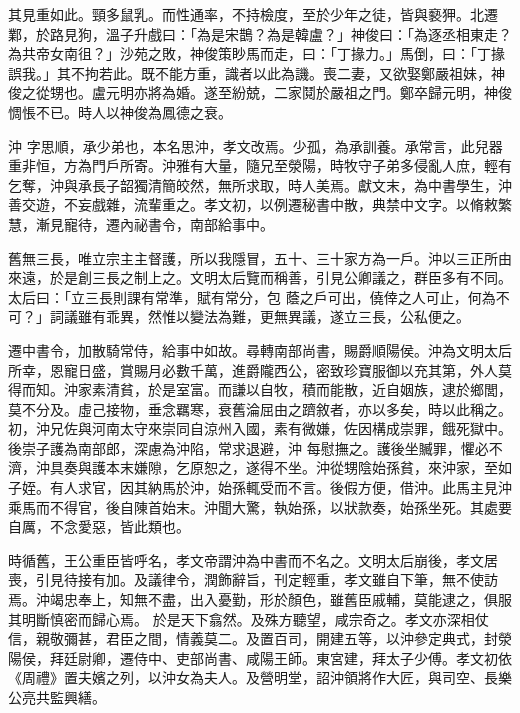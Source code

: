 \begin{pinyinscope}
 其見重如此。頸多鼠乳。而性通率，不持檢度，至於少年之徒，皆與褻狎。北遷鄴，於路見狗，溫子升戲曰：「為是宋鵲？為是韓盧？」神俊曰：「為逐丞相東走？為共帝女南徂？」沙苑之敗，神俊策眇馬而走，曰：「丁掾力。」馬倒，曰：「丁掾誤我。」其不拘若此。既不能方重，識者以此為譏。喪二妻，又欲娶鄭嚴祖妹，神俊之從甥也。盧元明亦將為婚。遂至紛兢，二家鬩於嚴祖之門。鄭卒歸元明，神俊惆悵不已。時人以神俊為鳳德之衰。



 沖
 字思順，承少弟也，本名思沖，孝文改焉。少孤，為承訓養。承常言，此兒器重非恒，方為門戶所寄。沖雅有大量，隨兄至滎陽，時牧守子弟多侵亂人庶，輕有乞奪，沖與承長子韶獨清簡皎然，無所求取，時人美焉。獻文末，為中書學生，沖善交遊，不妄戲雜，流輩重之。孝文初，以例遷秘書中散，典禁中文字。以脩敕繁慧，漸見寵待，遷內祕書令，南部給事中。



 舊無三長，唯立宗主主督護，所以我隱冒，五十、三十家方為一戶。沖以三正所由來遠，於是創三長之制上之。文明太后覽而稱善，引見公卿議之，群臣多有不同。太后曰：「立三長則課有常準，賦有常分，包
 蔭之戶可出，僥倖之人可止，何為不可？」詞議雖有乖異，然惟以變法為難，更無異議，遂立三長，公私便之。



 遷中書令，加散騎常侍，給事中如故。尋轉南部尚書，賜爵順陽侯。沖為文明太后所幸，恩寵日盛，賞賜月必數千萬，進爵隴西公，密致珍寶服御以充其第，外人莫得而知。沖家素清貧，於是室富。而謙以自牧，積而能散，近自姻族，逮於鄉閭，莫不分及。虛己接物，垂念羈寒，衰舊淪屈由之躋敘者，亦以多矣，時以此稱之。初，沖兄佐與河南太守來崇同自涼州入國，素有微嫌，佐因構成崇罪，餓死獄中。後崇子護為南部郎，深慮為沖陷，常求退避，沖
 每慰撫之。護後坐贓罪，懼必不濟，沖具奏與護本末嫌隙，乞原恕之，遂得不坐。沖從甥陰始孫貧，來沖家，至如子姪。有人求官，因其納馬於沖，始孫輒受而不言。後假方便，借沖。此馬主見沖乘馬而不得官，後自陳首始末。沖聞大驚，執始孫，以狀款奏，始孫坐死。其處要自厲，不念愛惡，皆此類也。



 時循舊，王公重臣皆呼名，孝文帝謂沖為中書而不名之。文明太后崩後，孝文居喪，引見待接有加。及議律令，潤飾辭旨，刊定輕重，孝文雖自下筆，無不使訪焉。沖竭忠奉上，知無不盡，出入憂勤，形於顏色，雖舊臣戚輔，莫能逮之，俱服其明斷慎密而歸心焉。
 於是天下翕然。及殊方聽望，咸宗奇之。孝文亦深相仗信，親敬彌甚，君臣之間，情義莫二。及置百司，開建五等，以沖參定典式，封滎陽侯，拜廷尉卿，遷侍中、吏部尚書、咸陽王師。東宮建，拜太子少傅。孝文初依《周禮》置夫嬪之列，以沖女為夫人。及營明堂，詔沖領將作大匠，與司空、長樂公亮共監興繕。




\end{pinyinscope}
